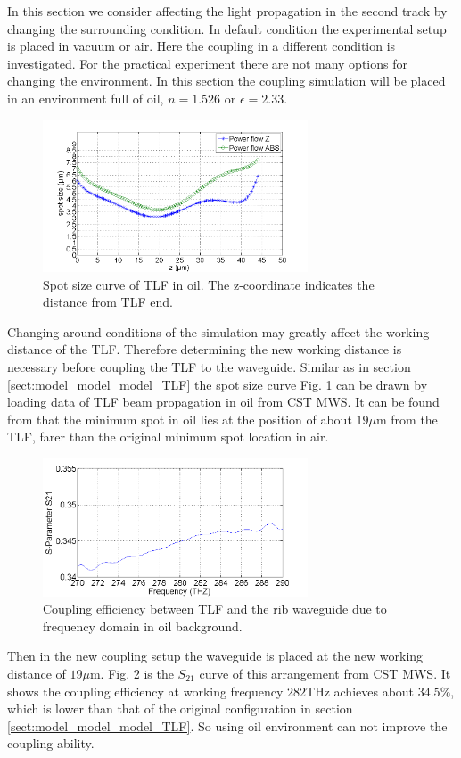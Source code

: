 In this section we consider affecting the light propagation in the second track by changing the surrounding condition. In default condition the experimental setup is placed in vacuum or air. Here the coupling in a different condition is investigated. For the practical experiment there are not many options for changing the environment. In this section the coupling simulation will be placed in an environment full of oil, $n=1.526$ or $\epsilon=2.33$. \\

\begin{figure}[!ht]
\centering
\includegraphics[width=0.7\textwidth]{bilder/spot_curve_oil}
\caption{Spot size curve of TLF in oil. The z-coordinate indicates the distance from TLF end.}
\label{fig:oil_spot_curve}
\end{figure}
Changing around conditions of the simulation may greatly affect the working distance of the TLF. Therefore determining the new working distance is necessary before coupling the TLF to the waveguide.  Similar as in section \ref{sect:model_model_model_TLF} the spot size curve Fig. \ref{fig:oil_spot_curve} can be drawn by loading data of TLF beam propagation in oil from CST MWS. It can be found from that the minimum spot in oil lies at the position of about $19\mu$m from the TLF, farer than the original minimum spot location in air.\\    
\begin{figure}[!ht]
\centering
\includegraphics[width=0.7\textwidth]{bilder/s21_oil_curve}
\caption{Coupling efficiency between TLF and the rib waveguide due to frequency domain in oil background. }
\label{fig:oil_coupling_curve}
\end{figure}

Then in the new coupling setup the waveguide is placed at the new working distance of $19\mu$m. Fig. \ref{fig:oil_coupling_curve} is the $S_{21}$ curve of this arrangement from CST MWS. It shows the coupling efficiency at working frequency $282$THz achieves about $34.5\%$, which is lower than that of the original configuration in section \ref{sect:model_model_model_TLF}. So using oil environment can not improve the coupling ability.\\

